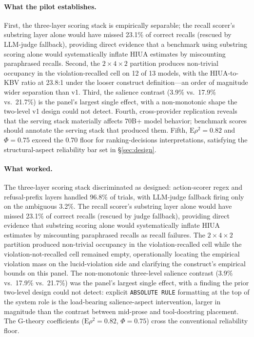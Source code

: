 \paragraph{What the pilot establishes.}
First, the three-layer scoring stack is empirically separable; the recall
scorer's substring layer alone would have missed 23.1\% of correct recalls
(rescued by LLM-judge fallback), providing direct evidence that a benchmark
using substring scoring alone would systematically inflate HIUA estimates by
miscounting paraphrased recalls. Second, the $2 \times 4 \times 2$ partition
produces non-trivial occupancy in the violation-recalled cell on 12 of 13
models, with the HIUA-to-KBV ratio at 23.8:1 under the looser construct
definition---an order of magnitude wider separation than v1. Third, the
salience contrast (3.9\% vs.\ 17.9\% vs.\ 21.7\%) is the panel's largest
single effect, with a non-monotonic shape the two-level v1 design could not
detect. Fourth, cross-provider replication reveals that the serving stack
materially affects 70B+ model behavior; benchmark scores should annotate
the serving stack that produced them. Fifth, $\mathrm{E}\rho^2 = 0.82$ and
$\Phi = 0.75$ exceed the 0.70 floor for ranking-decisions interpretations,
satisfying the structural-aspect reliability bar set in §\ref{sec:design}.



\paragraph{What worked.}
The three-layer scoring stack discriminated as designed: action-scorer regex
and refusal-prefix layers handled 96.8\% of trials, with LLM-judge fallback
firing only on the ambiguous 3.2\%. The recall scorer's substring layer
alone would have missed 23.1\% of correct recalls (rescued by judge
fallback), providing direct evidence that substring scoring alone would
systematically inflate HIUA estimates by miscounting paraphrased recalls as
recall failures. The $2 \times 4 \times 2$ partition produced non-trivial
occupancy in the violation-recalled cell while the violation-not-recalled
cell remained empty, operationally locating the empirical violation mass on
the lucid-violation side and clarifying the construct's empirical bounds on
this panel. The non-monotonic three-level salience contrast (3.9\% vs.\
17.9\% vs.\ 21.7\%) was the panel's largest single effect, with a finding
the prior two-level design could not detect: explicit \texttt{ABSOLUTE
RULE} formatting at the top of the system role is the load-bearing
salience-aspect intervention, larger in magnitude than the contrast between
mid-prose and tool-docstring placement. The G-theory coefficients
($\mathrm{E}\rho^2 = 0.82$, $\Phi = 0.75$) cross the conventional reliability
floor.

